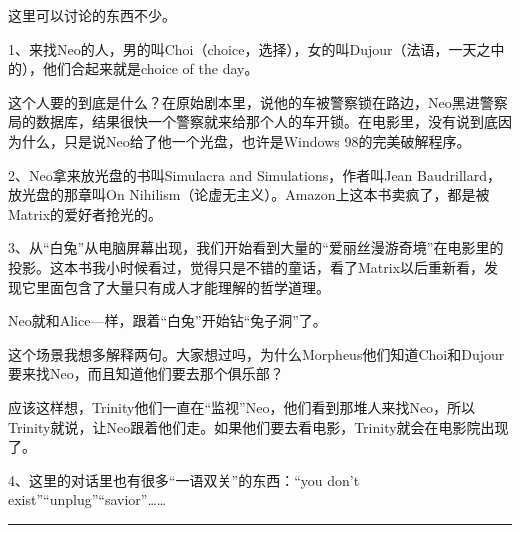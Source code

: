 \documentclass[UTF8]{ctexart}
\newcommand{\myparsep}{\noindent \rule[0.5ex]{\linewidth}{1pt}}
\begin{document}
这里可以讨论的东西不少。

1、来找Neo的人，男的叫Choi（choice，选择），女的叫Dujour（法语，一天之中的），他们合起来就是choice of the day。

这个人要的到底是什么？在原始剧本里，说他的车被警察锁在路边，Neo黑进警察局的数据库，结果很快一个警察就来给那个人的车开锁。在电影里，没有说到底因为什么，只是说Neo给了他一个光盘，也许是Windows 98的完美破解程序。

2、Neo拿来放光盘的书叫Simulacra and Simulations，作者叫Jean Baudrillard，放光盘的那章叫On Nihilism（论虚无主义）。Amazon上这本书卖疯了，都是被Matrix的爱好者抢光的。

3、从“白兔”从电脑屏幕出现，我们开始看到大量的“爱丽丝漫游奇境”在电影里的投影。这本书我小时候看过，觉得只是不错的童话，看了Matrix以后重新看，发现它里面包含了大量只有成人才能理解的哲学道理。

Neo就和Alice—样，跟着“白兔”开始钻“兔子洞”了。

这个场景我想多解释两句。大家想过吗，为什么Morpheus他们知道Choi和Dujour要来找Neo，而且知道他们要去那个俱乐部？

应该这样想，Trinity他们一直在“监视”Neo，他们看到那堆人来找Neo，所以Trinity就说，让Neo跟着他们走。如果他们要去看电影，Trinity就会在电影院出现了。

4、这里的对话里也有很多“一语双关”的东西：“you don't exist”“unplug”“savior”……

\myparsep
\end{document}
